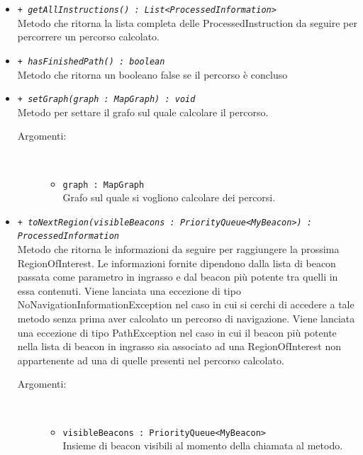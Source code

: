 \documentclass[../DefinizioneDiProdotto.tex]{subfiles}
\begin{document}
\begin{description}
\begin{itemize}
\begin{description}
		\end{description}
		\item \texttt{+ \textit{getAllInstructions() : List<ProcessedInformation>}}\\
		Metodo che ritorna la lista completa delle ProcessedInstruction da seguire per percorrere un percorso calcolato.
		\item \texttt{+ \textit{hasFinishedPath() : boolean}}\\
		Metodo che ritorna un booleano false se il percorso è concluso
		\item \texttt{+ \textit{setGraph(graph : MapGraph) : void}}\\
		Metodo per settare il grafo sul quale calcolare il percorso.
		\begin{description}
			\item[Argomenti:] \
			\begin{itemize}
				\item \texttt{graph : MapGraph}\\
				Grafo sul quale si vogliono calcolare dei percorsi.\end{itemize}
		\end{description}
		\item \texttt{+ \textit{toNextRegion(visibleBeacons : PriorityQueue<MyBeacon>) : ProcessedInformation}}\\
		Metodo che ritorna le informazioni da seguire per raggiungere la prossima RegionOfInterest. Le informazioni fornite dipendono dalla lista di beacon passata come parametro in ingrasso e dal beacon più potente tra quelli in essa contenuti. 
		Viene lanciata una eccezione di tipo NoNavigationInformationException nel caso in cui si cerchi di accedere a tale metodo senza prima aver calcolato un percorso di navigazione.
		Viene lanciata una eccezione di tipo PathException nel caso in cui il beacon più potente nella lista di beacon in ingrasso sia associato ad una RegionOfInterest non appartenente ad una di quelle presenti nel percorso calcolato.
		\begin{description}
			\item[Argomenti:] \
			\begin{itemize}
				\item \texttt{visibleBeacons : PriorityQueue<MyBeacon>}\\
				Insieme di beacon visibili al momento della chiamata al metodo.\end{itemize}
		\end{description}
	\end{itemize}
\end{description}
\end{document}
